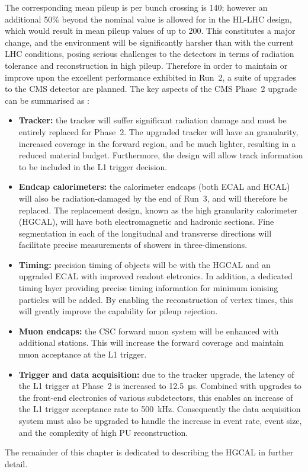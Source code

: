 The corresponding mean pileup is per bunch crossing is 140; however an additional 50\% beyond the nominal value is allowed for in the HL-LHC design, 
which would result in mean pileup values of up to 200.
This constitutes a major change, and the environment will be significantly harsher than with the current LHC conditions, 
posing serious challenges to the detectors in terms of radiation tolerance and reconstruction in high pileup.
Therefore in order to maintain or improve upon the excellent performance exhibited in Run~2, a suite of upgrades to the CMS detector are planned.
The key aspects of the CMS Phase~2 upgrade can be summarised as \cite{UpgradeTP,MTD}:
\begin{itemize}
  \item{\textbf{Tracker:}
  the tracker will suffer significant radiation damage and must be entirely replaced for Phase~2.
  The upgraded tracker will have an granularity, %
  increased coverage in the forward region, %
  and be much lighter, resulting in a reduced material budget.
  Furthermore, the design will allow track information to be included in the L1 trigger decision.}
  \item{\textbf{Endcap calorimeters:}
  the calorimeter endcaps (both ECAL and HCAL) will also be radiation-damaged by the end of Run~3, and will therefore be replaced.
  The replacement design, known as the high granularity calorimeter (HGCAL), will have both electromagnetic and hadronic sections.
  Fine segmentation in each of the longitudnal and transverse directions will facilitate precise measurements of showers in three-dimensions.}
  \item{\textbf{Timing:}
  precision timing of objects will be with the HGCAL and an upgraded ECAL with improved readout eletronics.
  In addition, a dedicated timing layer providing precise timing information for minimum ionising particles will be added.
  By enabling the reconstruction of vertex times, this will greatly improve the capability for pileup rejection.}
  \item{\textbf{Muon endcaps:}
  the CSC forward muon system will be enhanced with additional stations.
  This will increase the forward coverage and maintain muon acceptance at the L1 trigger.}
  \item{\textbf{Trigger and data acquisition:}
  due to the tracker upgrade, the latency of the L1 trigger at Phase~2 is increased to \SI{12.5}{\micro\second}.
  Combined with upgrades to the front-end electronics of various subdetectors, %
  this enables an increase of the L1 trigger acceptance rate to \SI{500}{\kilo\hertz}.
  Consequently the data acquisition system must also be upgraded to handle the increase in event rate, event size, and the complexity of high PU reconstruction.}
\end{itemize}
The remainder of this chapter is dedicated to describing the HGCAL in further detail.

